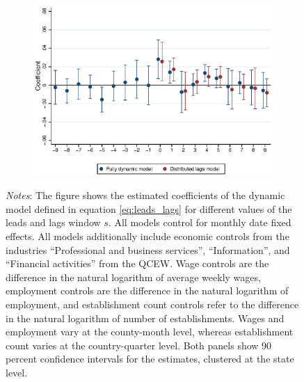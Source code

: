 \begin{figure}[htb!]
\begin{subfigure}[b]{0.5\textwidth}
		\includegraphics[width = .95\textwidth]
		{../../analysis/first_differences/output/fd_models_coeffs_w9.eps}
	\end{subfigure}
	\begin{minipage}{0.95\textwidth} \footnotesize
		\vspace{2mm} 
		\textit{Notes}: The figure shows the estimated coefficients of the dynamic model defined 
		in equation \autoref{eq:leads_lags} for different values of the leads and lags window $s$.
		All models control for 
		monthly date fixed effects. All models additionally  include economic controls from the 
		industries ``Professional and business services'', ``Information'', and ``Financial 
		activities'' from the QCEW. Wage controls are the difference in the natural logarithm of 
		average weekly wages, employment controls are the difference in the natural logarithm of 
		employment, and establishment count controls refer to the difference in the natural 
		logarithm of number of establishments. Wages and employment vary at the county-month 
		level, whereas establishment count varies at the country-quarter level. Both panels
		show 90 percent confidence intervals for the estimates, clustered at the state level. 
	\end{minipage}
\end{figure}

